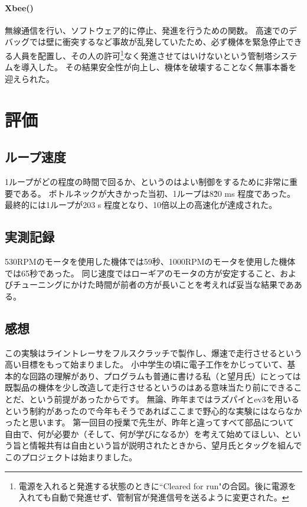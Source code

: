 \documentclass{ltjsreport}
\begin{document}
\subsubsection{Xbee()}
無線通信を行い、ソフトウェア的に停止、発進を行うための関数。
高速でのデバッグでは壁に衝突するなど事故が乱発していたため、必ず機体を緊急停止できる人員を配置し、その人の許可\footnote{電源を入れると発進する状態のときに``Cleared for run"の合図。後に電源を入れても自動で発進せず、管制官が発進信号を送るように変更された。}なく発進させてはいけないという管制塔システムを導入した。
その結果安全性が向上し、機体を破壊することなく無事本番を迎えられた。




\chapter{評価}\label{cha:eval}

\section{ループ速度}
1ループがどの程度の時間で回るか、というのはよい制御をするために非常に重要である。
ボトルネックが大きかった当初、1ループは8\~20 ms 程度であった。
最終的には1ループが203 \mu s 程度となり、10倍以上の高速化が達成された。

\section{実測記録}
530RPMのモータを使用した機体では59秒、1000RPMのモータを使用した機体では65秒であった。
同じ速度ではローギアのモータの方が安定すること、およびチューニングにかけた時間が前者の方が長いことを考えれば妥当な結果であある。
\section{感想}
この実験はライントレーサをフルスクラッチで製作し、爆速で走行させるという高い目標をもって始まりました。
小中学生の頃に電子工作をかじっていて、基本的な回路の理解があり、プログラムも普通に書ける私（と望月氏）にとっては既製品の機体を少し改造して走行させるというのはある意味当たり前にできることだ、という前提があったからです。
無論、昨年まではラズパイとev3を用いるという制約があったので今年もそうであればここまで野心的な実験にはならなかったと思います。
第一回目の授業で先生が、昨年と違ってすべて部品について自由で、何が必要か（そして、何が学びになるか）を考えて始めてほしい、という旨と情報共有は自由という旨が説明されたときから、望月氏とタッグを組んでこのプロジェクトは始まりました。
\end{document}
